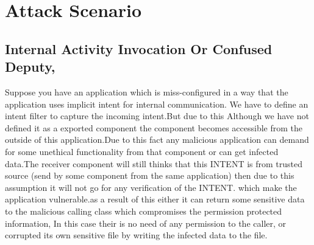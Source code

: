 \documentclass[11pt]{report}
\begin{document}
\section{Attack Scenario}
\subsection{ Internal Activity Invocation Or Confused Deputy,}
Suppose you have an application which is miss-configured in a way that the application uses implicit intent for internal communication.
We have to define an intent filter to capture the incoming intent.But due to this Although we have not defined it as a exported component the
component becomes accessible from the outside of this application.Due to this fact any malicious application can demand for 
some unethical functionality from that component or can get infected data.The receiver component will still 
thinks that this INTENT is from trusted source (send by some component from the same application) then due to this assumption it will not go for any verification of the INTENT.
which make the application vulnerable.as a result of this either it can return some sensitive data to the malicious calling class which compromises the permission protected information,
In this case their is no need of any permission to the caller, or corrupted its own sensitive file by writing the infected data to the file.
\end{document}
